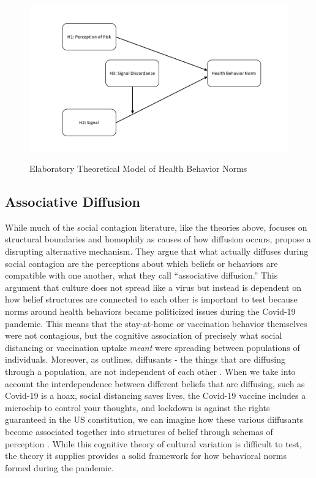 \begin{figure}
{\centering \includegraphics[width=0.8\linewidth]{figs/paper3/dag}}
\caption{Elaboratory Theoretical Model of Health Behavior Norms}\label{fig:dag}
\end{figure}

\hypertarget{associative-diffusion}{%
\subsection{Associative Diffusion}\label{associative-diffusion}}

While much of the social contagion literature, like the theories above, focuses
on structural boundaries and homophily as causes of how diffusion occurs,
\citet{goldbergSocialContagionAssociative2018} propose a
disrupting alternative mechanism. They argue that what actually diffuses during
social contagion are the perceptions about which beliefs or behaviors are
compatible with one another, what they call ``associative diffusion.'' This
argument that culture does not spread like a virus but instead is dependent on
how belief structures are connected to each other is important to test because
norms around health behaviors became politicized issues during the Covid-19
pandemic. This means that the stay-at-home or vaccination behavior themselves
were not contagious, but the cognitive association of precisely what social
distancing or vaccination uptake \emph{meant} were spreading between populations of
individuals. Moreover, as \citet{houghton20} outlines, diffusants - the things that are
diffusing through a population, are not independent of each other \citep{mason_etal07}. When we take into account the interdependence between different beliefs that are diffusing, such as Covid-19 is a hoax, social distancing saves
lives, the Covid-19 vaccine includes a microchip to control your thoughts, and lockdown
is against the rights guaranteed in the US constitution, we can imagine how
these various diffusants become associated together into structures of belief
through schemas of perception \citep{houghton20}. While this cognitive theory of cultural variation is difficult to test, the theory it supplies provides a solid framework for how behavioral norms formed during the pandemic.

